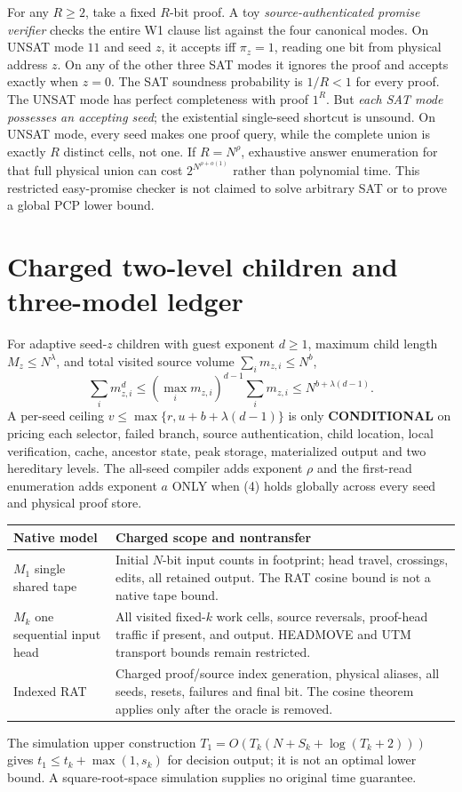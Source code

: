 \documentclass[11pt]{article}
\begin{document}
For any $R\ge2$, take a fixed $R$-bit proof. A toy
\emph{source-authenticated promise verifier} checks the
entire W1 clause list against the four canonical modes.
On UNSAT mode $11$ and seed $z$, it accepts iff
$\pi_z=1$, reading one bit from physical address $z$.
On any of the other three SAT modes it ignores the proof
and accepts exactly when $z=0$.
The SAT soundness probability is $1/R<1$ for every proof.
The UNSAT mode has perfect completeness with proof $1^R$.
But \emph{each SAT mode possesses an accepting seed};
the existential single-seed shortcut is unsound.
On UNSAT mode, every seed makes one proof query,
while the complete union is exactly $R$ distinct
cells, not one. If $R=N^\rho$, exhaustive answer
enumeration for that full physical union can cost
$2^{N^{\rho+o(1)}}$ rather than polynomial time.
This restricted easy-promise checker is not claimed
to solve arbitrary SAT or to prove a global PCP lower bound.


\section{Charged two-level children and three-model ledger}
For adaptive seed-$z$ children with guest exponent $d\ge1$,
maximum child length $M_z\le N^\lambda$, and total
visited source volume $\sum_i m_{z,i}\le N^b$,
\[
\sum_i m_{z,i}^d
 \le(\max_i m_{z,i})^{d-1}\sum_i m_{z,i}
 \le N^{b+\lambda(d-1)}. \tag{8}
\]
A per-seed ceiling $v\le\max\{r,u+b+\lambda(d-1)\}$
is only \textbf{CONDITIONAL} on pricing each selector,
failed branch, source authentication, child location,
local verification, cache, ancestor state, peak storage,
materialized output and two hereditary levels.
The all-seed compiler adds exponent $\rho$ and
the first-read enumeration adds exponent $a$ ONLY
when (4) holds globally across every seed and
physical proof store.

\begin{center}\small
\begin{tabularx}{.94\linewidth}{p{.21\linewidth}X}
\toprule
Native model & Charged scope and nontransfer\\\midrule
$M_1$ single shared tape &
Initial $N$-bit input counts in footprint;
head travel, crossings, edits, all retained output.
The RAT cosine bound is not a native tape bound.\\
$M_k$ one sequential input head &
All visited fixed-$k$ work cells, source reversals,
proof-head traffic if present, and output.
HEADMOVE and UTM transport bounds remain restricted.\\
Indexed RAT &
Charged proof/source index generation,
physical aliases, all seeds, resets, failures
and final bit. The cosine theorem applies
only after the oracle is removed.\\\bottomrule
\end{tabularx}
\end{center}
The simulation upper construction
$T_1=O(T_k(N+S_k+\log(T_k+2)))$ gives
$t_1\le t_k+\max(1,s_k)$ for decision output;
it is not an optimal lower bound.
A square-root-space simulation supplies
no original time guarantee.
\end{document}
